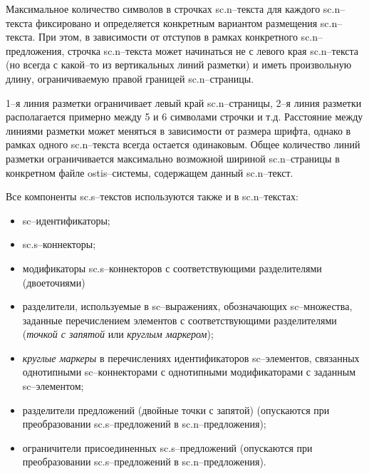 Максимальное количество символов в строчках sc.n--текста для каждого sc.n--текста фиксировано и определяется конкретным вариантом размещения sc.n--текста. При этом, в зависимости от отступов в рамках конкретного sc.n--предложения, строчка sc.n--текста может начинаться не с левого края sc.n--текста (но всегда с какой--то из вертикальных линий разметки) и иметь произвольную длину, ограничиваемую правой границей sc.n--страницы.

\begin{SCn}
\end{SCn}
1--я линия разметки ограничивает левый край sc.n--страницы, 2--я линия разметки располагается примерно между 5 и 6 символами строчки и т.д. Расстояние между линиями разметки может меняться в зависимости от размера шрифта, однако в рамках одного sc.n--текста всегда остается одинаковым. Общее количество линий разметки ограничивается максимально возможной шириной sc.n--страницы в конкретном файле ostis--системы, содержащем данный sc.n--текст.

\begin{SCn}
\begin{scnhaselementset}
\end{scnhaselementset}
\end{SCn}


Все компоненты sc.s--текстов используются также и в sc.n--текстах:
\begin{itemize}
	\item sc--идентификаторы;
	\item sc.s--коннекторы;
	\item модификаторы sc.s--коннекторов с соответствующими разделителями (двоеточиями)
	\item разделители, используемые в sc--выражениях, обозначающих sc--множества, заданные перечислением элементов с соответствующими разделителями (\textit{точкой с запятой} или \textit{круглым маркером});
	\item \textit{круглые маркеры} в перечислениях идентификаторов \mbox{sc--элементов}, связанных однотипными sc--коннекторами с однотипными модификаторами с заданным sc--элементом;
	\item разделители предложений (двойные точки с запятой) (опускаются при преобразовании \mbox{sc.s--предложений} в \mbox{sc.n--предложения});
	\item ограничители присоединенных sc.s--предложений (опускаются при преобразовании sc.s--предложений в sc.n--предложения).
\end{itemize}

